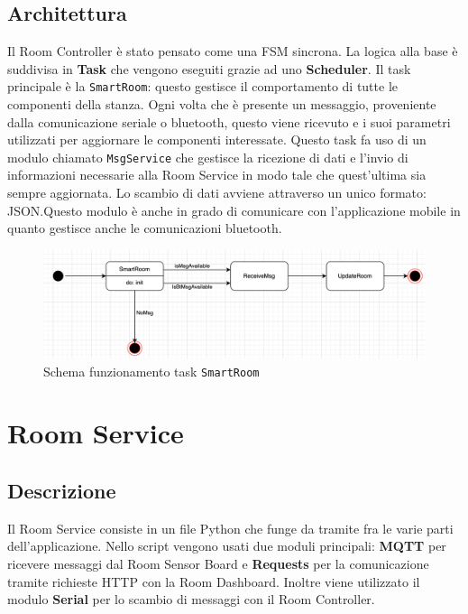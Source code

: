 \documentclass[12pt]{article}
\def\code#1{\texttt{#1}}
\begin{document}
\subsection{Architettura}
Il Room Controller è stato pensato come una FSM sincrona. La logica alla base è suddivisa in \textbf{Task} che vengono eseguiti grazie ad uno \textbf{Scheduler}.\newline
Il task principale è la \code{SmartRoom}: questo gestisce il comportamento di tutte le componenti della stanza. Ogni volta che è presente un messaggio, proveniente dalla comunicazione seriale o bluetooth, questo viene ricevuto e i suoi parametri utilizzati per aggiornare le componenti interessate. Questo task fa uso di un modulo chiamato \code{MsgService} che gestisce la ricezione di dati e l'invio di informazioni necessarie alla Room Service in modo tale che quest'ultima sia sempre aggiornata. Lo scambio di dati avviene attraverso un unico formato: JSON.\@ Questo modulo è anche in grado di comunicare con l'applicazione mobile in quanto gestisce anche le comunicazioni bluetooth.\newline
\begin{figure}[H]
    \includegraphics[width=17cm]{arduino-schema.png}
    \centering
    \caption{Schema funzionamento task \code{SmartRoom}}
    \centering
\end{figure}
\newpage


\section{Room Service}

\subsection{Descrizione}
Il Room Service consiste in un file Python che funge da tramite fra le varie parti dell'applicazione. Nello script vengono usati due moduli principali: \textbf{MQTT} per ricevere messaggi dal Room Sensor Board e \textbf{Requests} per la comunicazione tramite richieste HTTP con la Room Dashboard. Inoltre viene utilizzato il modulo \textbf{Serial} per lo scambio di messaggi con il Room Controller.
\end{document}
